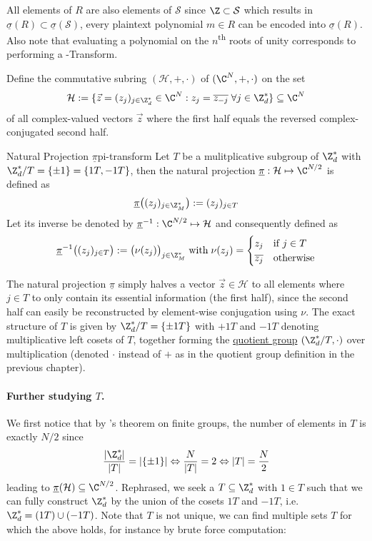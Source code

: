 All elements of $R$ are also elements of $\mathcal{S}$ since $\Z \subset \mathcal{S}$ which results in $\underline{\sigma}(R) \subset \underline{\sigma}(\mathcal{S})$, every plaintext polynomial $m \in R$ can be encoded into $\underline{\sigma}(R)$.
Also note that evaluating a polynomial on the $n$\textsuperscript{th} roots of unity corresponds to performing a -Transform.

Define the commutative subring $(\mathcal{H}, +, \cdot)$ of $(\C^N, +, \cdot)$ on the set
$$\mathcal{H} := \{\vec{z} = (z_j)_{j \in \Z_d^*} \in \C^N : z_j = \overline{z_{-j}} \;\forall j \in \Z_d^*\} \subseteq \C^N$$
of all complex-valued vectors $\vec{z}$ where the first half equals the reversed complex-conjugated second half.

\begin{definition}{Natural Projection $\underline{\pi}$}{pi-transform}
  Let $T$ be a mulitplicative subgroup of $\Z_d^*$ with $\Z_d^* / T = \{\pm 1\} = \{1T, -1T\}$, then the natural projection $\underline{\pi}: \mathcal{H} \mapsto \C^{N/2}$ is defined as
  $$\underline{\pi}\big((z_j)_{j \in \Z_M^*}\big) := (z_j)_{j \in T}$$
  Let its inverse be denoted by $\underline{\pi}\inv: \C^{N/2} \mapsto \mathcal{H}$ and consequently defined as
  $$\underline{\pi}\inv\big((z_j)_{j \in T}\big) := \big(\nu(z_j)\big)_{j \in \Z_M^*} \; \mathrm{with} \; \nu(z_j) = \begin{cases}
      z_j            & \text{if } j \in T \\
      \overline{z_j} & \text{otherwise}
    \end{cases}$$
\end{definition}

The natural projection $\underline{\pi}$ simply halves a vector $\vec{z} \in \mathcal{H}$ to all elements where $j \in T$ to only contain its essential information (the first half), since the second half can easily be reconstructed by element-wise conjugation using $\nu$.
The exact structure of $T$ is given by $\Z_d^* / T = \{\pm 1T\}$ with $+1T$ and $-1T$ denoting multiplicative left cosets of $T$, together forming the \hyperref[def:quotient-group]{quotient group} $(\Z_d^* / T, \cdot)$ over multiplication (denoted $\cdot$ instead of $+$ as in the quotient group definition in the previous chapter).

\paragraph{Further studying $T$.}
We first notice that by 's theorem on finite groups, the number of elements in $T$ is exactly $N / 2$ since $$\frac{|\Z_d^*|}{|T|} = |\{\pm 1\}| \Leftrightarrow \frac{N}{|T|} = 2 \Leftrightarrow |T| = \frac{N}{2}$$ leading to $\underline{\pi}(\mathcal{H}) \subseteq \C^{N/2}$.
Rephrased, we seek a $T \subseteq \Z_d^*$ with $1 \in T$ such that we can fully construct $\Z_d^*$ by the union of the cosets $1T$ and $-1T$, i.e. $\Z_d^* = (1T) \cup (-1T)$.
Note that $T$ is not unique, we can find multiple sets $T$ for which the above holds, for instance by brute force computation:

